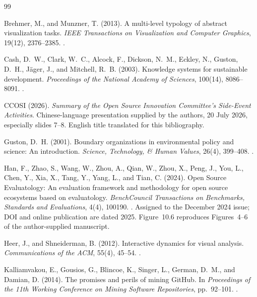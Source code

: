 \begin{thebibliography}{99}
\label{refs:chapter10}

Brehmer, M., and Munzner, T. (2013).
A multi-level typology of abstract visualization tasks.
\emph{IEEE Transactions on Visualization and Computer Graphics}, 19(12), 2376--2385.
.

Cash, D.~W., Clark, W.~C., Alcock, F., Dickson, N.~M., Eckley, N., Guston, D.~H., Jäger, J., and Mitchell, R.~B. (2003).
Knowledge systems for sustainable development.
\emph{Proceedings of the National Academy of Sciences}, 100(14), 8086--8091.
.

CCOSI (2026).
\emph{Summary of the Open Source Innovation Committee's Side-Event Activities}.
Chinese-language presentation supplied by the authors, 20 July 2026, especially slides 7--8. English title translated for this bibliography.

Guston, D.~H. (2001).
Boundary organizations in environmental policy and science: An introduction.
\emph{Science, Technology, \& Human Values}, 26(4), 399--408.
.

Han, F., Zhao, S., Wang, W., Zhou, A., Qian, W., Zhou, X., Peng, J., You, L., Chen, Y., Xia, X., Tang, Y., Yang, L., and Tian, C. (2024).
Open Source Evaluatology: An evaluation framework and methodology for open source ecosystems based on evaluatology.
\emph{BenchCouncil Transactions on Benchmarks, Standards and Evaluations}, 4(4), 100190.
.
Assigned to the December 2024 issue; DOI and online publication are dated 2025. Figure~10.6 reproduces Figures~4--6 of the author-supplied manuscript.

Heer, J., and Shneiderman, B. (2012).
Interactive dynamics for visual analysis.
\emph{Communications of the ACM}, 55(4), 45--54.
.

Kalliamvakou, E., Gousios, G., Blincoe, K., Singer, L., German, D.~M., and Damian, D. (2014).
The promises and perils of mining GitHub.
In \emph{Proceedings of the 11th Working Conference on Mining Software Repositories}, pp.~92--101.
.


\end{thebibliography}
